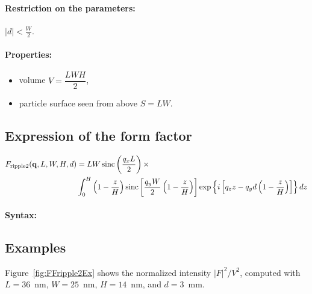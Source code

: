 \paragraph{Restriction on the parameters:} $|d| < \frac{W}{2} $.

\paragraph{Properties:}
\begin{itemize}
\item volume $V = \dfrac{L W H}{2}$,
\item particle surface seen from above $S = L W$.
\end{itemize}

\subsection{Expression of the form factor}
\begin{align*}
F_{\rm{ripple2}}(\mathbf{q},L,W,H,d) &=L W
\operatorname{sinc}\left(\frac{q_xL}{2}\right)\times \\ &
\int_0^H 
\left(1-\frac{z}{H}\right)
 \operatorname{sinc}\left[\frac{q_y
    W}{2}\left(1-\frac{z}{H}\right)\right] 
\exp\left\{ i\left[q_zz -
    q_yd\left(1-\frac{z}{H}\right)\right]\right\} 
dz
\end{align*}

\paragraph{Syntax:} 

\subsection{Examples}
Figure~\ref{fig:FFripple2Ex} shows the normalized intensity
$|F|^2/V^2$, computed with $L=36$~nm, $W=25$~nm, $H=14$~nm, and $d=3$~mm.

